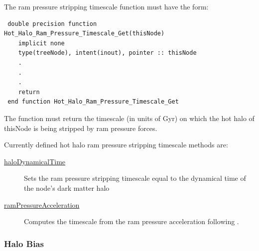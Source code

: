 The ram pressure stripping timescale function must have the form:
\begin{verbatim}
 double precision function Hot_Halo_Ram_Pressure_Timescale_Get(thisNode)
    implicit none
    type(treeNode), intent(inout), pointer :: thisNode
    .
    .
    .
    return
 end function Hot_Halo_Ram_Pressure_Timescale_Get
\end{verbatim}
The function must return the timescale (in units of Gyr) on which the hot halo of {\normalfont \ttfamily thisNode} is being stripped by ram pressure forces.

Currently defined hot halo ram pressure stripping timescale methods are:
\begin{description}
 \item [\hyperlink{hot_halo.ram_pressure_stripping.timescale.halo_dynamical_time.F90:hot_halo_ram_pressure_timescales_halo_dyntime:hot_halo_ram_pressure_timescale_halo_dyntime}{{\normalfont \ttfamily haloDynamicalTime}}] Sets the ram pressure stripping timescale equal to the dynamical time of the node's dark matter halo
 \item [\hyperlink{hot_halo.ram_pressure_stripping.timescale.ram_pressure_acceleration.F90:hot_halo_ram_pressure_timescales_ram_pressure_accel:hot_halo_ram_pressure_timescale_ram_pressure_accel}{{\normalfont \ttfamily ramPressureAcceleration}}] Computes the timescale from the ram pressure acceleration following \cite{roediger_ram_2007}.
\end{description}

\subsubsection{Halo Bias}

